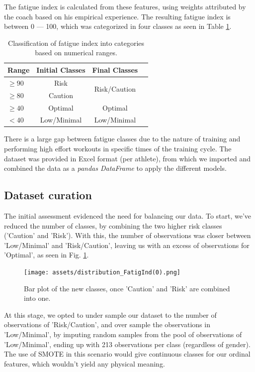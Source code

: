 \documentclass[conference]{IEEEtran}
\begin{document}
The fatigue index is calculated from these features, using weights attributed by the coach based on his empirical experience. The resulting fatigue index is between 0 — 100, which was categorized in four classes as seen in Table \ref{classTable}. 


\begin{table}[H]
\centering
\caption{Classification of fatigue index into categories based on numerical ranges.}
\label{classTable}
\begin{tabular}{lccc}
\toprule
\textbf{Range} & \textbf{Initial Classes} & \textbf{Final Classes} \\
\midrule
$\geq  90$ & Risk & \multirow{2}{*}{Risk/Caution} \\
$\geq  80$ & Caution & \\
$\geq 40$ & Optimal & Optimal \\
$< 40$ & Low/Minimal & Low/Minimal \\
\bottomrule
\end{tabular}
\end{table}


There is a large gap between fatigue classes due to the nature of training and performing high effort workouts in specific times of the training cycle. The dataset was provided in Excel format (per athlete), from which we imported and combined the data as a \textit{pandas DataFrame} to apply the different models.



\subsection{Dataset curation}

The initial assessment evidenced the need for balancing our data. To start, we've reduced the number of classes, by combining the two higher risk classes ('Caution' and 'Risk'). With this, the number of observations was closer between 'Low/Minimal' and 'Risk/Caution', leaving us with an excess of observations for 'Optimal', as seen in Fig. \ref{histClasses}. 

\begin{figure}[H]
    \centering
    \texttt{[image: assets/distribution\_FatigInd(0).png]}
    \caption{Bar plot of the new classes, once 'Caution' and 'Risk' are combined into one.}
    \label{histClasses}
\end{figure} %

At this stage, we opted to under sample our dataset to the number of observations of 'Risk/Caution', and over sample the observations in 'Low/Minimal', by imputing random samples from the pool of observations of 'Low/Minimal', ending up with 213 observations per class (regardless of gender). The use of SMOTE in this scenario would give continuous classes for our ordinal features, which wouldn't yield any physical meaning.
\end{document}
